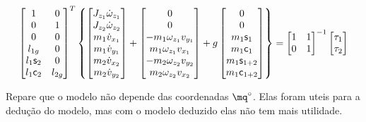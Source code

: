 \begin{itemize}
\begin{itemize}
	\begin{equation}
	\begin{bmatrix}
	1 & 0 \\
	0 & 1 \\
	0 & 0 \\
	l_{1g} & 0\\
	l_1 \mathsf{s}_{2} & 0 \\
	l_1 \mathsf{c}_{2} & l_{2g} \\
	\end{bmatrix}^T
	\begin{Bmatrix}
		\begin{bmatrix}
		J_{z_1} \dot{\omega}_{z_1} \\
		J_{z_2} \dot{\omega}_{z_2} \\
		m_1 \dot{v}_{x_1} \\ 
		m_1 \dot{v}_{y_1} \\
		m_2 \dot{v}_{x_2} \\
		m_2 \dot{v}_{y_2} \\
		\end{bmatrix}
		+
		\begin{bmatrix}
		0 \\
		0 \\
		-m_1 \omega_{z_1} v_{y_1} \\
		m_1 \omega_{z_1} v_{x_1} \\
		-m_2 \omega_{z_2} v_{y_2} \\
		m_2 \omega_{z_2} v_{x_2} \\
		\end{bmatrix}
		+
		g \begin{bmatrix}
		0 \\
		0 \\
		m_1  \mathsf{s}_1 \\
		m_1  \mathsf{c}_1 \\
		m_1  \mathsf{s}_{1+2} \\
		m_1  \mathsf{c}_{1+2}\\
		\end{bmatrix}
	\end{Bmatrix}
	=
	\begin{bmatrix}
	1 & 1 \\
	0 & 1 \\
	\end{bmatrix}^{-1}
	\begin{bmatrix}
	\tau_{1} \\
	\tau_{2} \\
	\end{bmatrix}
	\end{equation}
	
	Repare que o modelo não depende das coordenadas $\mq^\circ$. Elas foram uteis para a dedu\c{c}\~ao do modelo, mas com o modelo deduzido elas não tem mais utilidade.
	
	
	
	
	\end{itemize}
\end{itemize}

